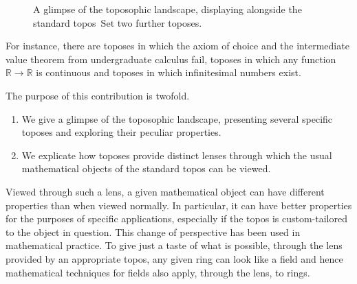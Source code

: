 \documentclass[graybox]{svmult}
\newcommand{\RR}{\mathbb{R}}
\newcommand{\Set}{\mathrm{Set}}
\renewcommand{\_}{\mathpunct{.}\,}
\newcommand{\?}{\,{:}\,}
\begin{document}
\begin{figure}[b]

  \caption{\label{fig:landscape}A glimpse of the toposophic landscape,
  displaying alongside the standard topos~$\Set$ two further toposes.}
\end{figure}


For instance, there are toposes in which the axiom of choice and the
intermediate value theorem from undergraduate calculus fail, toposes in which
any function~$\RR \to \RR$ is continuous and toposes in which infinitesimal
numbers exist.

The purpose of this contribution is twofold.
\begin{enumerate}
\item We give a glimpse of the toposophic landscape, presenting several
specific toposes and exploring their peculiar properties.

\item We explicate how toposes provide distinct lenses through which the
usual mathematical objects of the standard topos can be viewed.
\end{enumerate}

Viewed through such a lens, a given mathematical object can have different
properties than when viewed normally. In particular, it can have
better properties for the purposes of specific applications, especially if
the topos is custom-tailored to the object in question. This change of
perspective has been used in mathematical practice.
To give just a taste of what
is possible, through the lens provided by an appropriate topos, any given ring
can look like a field and hence mathematical techniques for fields also apply,
through the lens, to rings.
\end{document}

